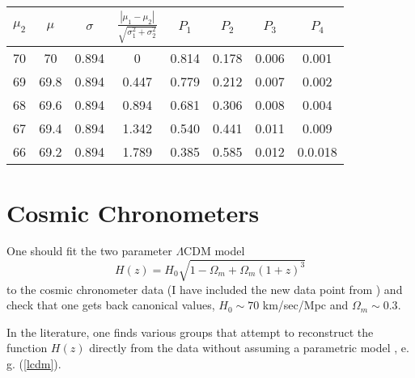 \documentclass[aps,prl,10pt,twocolumn,superscriptaddress]{revtex4}
\def\be{\begin{equation}}
\def\ee{\end{equation}}
\begin{document}
\begin{table}[htb]
    \centering
    \begin{tabular}{c|c|c|c|c|c|c|c}
    $\mu_2$ & $\mu$ & $\sigma$ & $\frac{|\mu_1-\mu_2|}{\sqrt{\sigma_1^2+\sigma_2^2}}$ & $P_1$ & $P_2$ & $P_3$ & $P_4$ \\
    \hline
    70 & 70 & 0.894 & 0 & 0.814 & 0.178 & 0.006 & 0.001\\
    69 & 69.8 & 0.894 & 0.447 & 0.779 & 0.212 & 0.007 & 0.002 \\
    68 & 69.6 & 0.894 & 0.894 & 0.681 & 0.306 & 0.008 & 0.004 \\
     67 & 69.4 & 0.894 & 1.342 & 0.540 & 0.441 & 0.011 & 0.009 \\
     66 & 69.2 & 0.894 & 1.789 & 0.385 & 0.585 & 0.012 & 0.0.018 
    \end{tabular}
    \caption{}
    \label{tab:antisymmetric_normals}
\end{table}

\section{Cosmic Chronometers}
One should fit the two parameter $\Lambda$CDM model 
\be
\label{lcdm}
H(z) = H_0 \sqrt{1-\Omega_m + \Omega_m (1+z)^3}
\ee
to the cosmic chronometer data (I have included the new data point from \cite{Tomasetti:2023kek}) and check that one gets back canonical values, $H_0 \sim 70$ km/sec/Mpc and $\Omega_m \sim 0.3$. 

In the literature, one finds various groups that attempt to reconstruct the function $H(z)$ directly from the data without assuming a parametric model \cite{Gomez-Valent:2018hwc, Haridasu:2018gqm}, e. g. (\ref{lcdm}).
\end{document}
